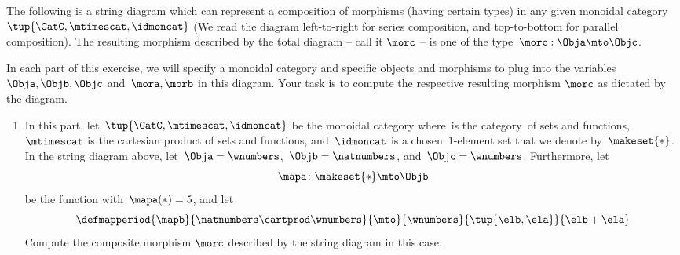 \begin{gradedexercise}\label{ex:StringDiagrams}

    The following is a string diagram which can represent a composition of morphisms (having certain types) in any given monoidal category~$\tup{\CatC,\mtimescat,\idmoncat}$
    (We read the diagram left-to-right for series composition, and top-to-bottom for parallel composition).
    The resulting morphism described by the total diagram -- call it $\morc$ -- is one of the type~$\morc : \Obja \mto \Objc$.

    \begin{center}
        \label{eq:ExamStringDiagram1}
    \end{center}

    In each part of this exercise, we will specify a monoidal category and specific objects and morphisms to plug into the variables~$\Obja, \Objb, \Objc$ and~$\mora, \morb$ in this diagram.
    Your task is to compute the respective resulting morphism $\morc$ as dictated by the diagram.

    \begin{enumerate}
        \item In this part, let~$\tup{\CatC,\mtimescat,\idmoncat}$ be the monoidal category where~\CatC is the category~\Set of sets and functions,~$\mtimescat$ is the cartesian product of sets and functions, and~$\idmoncat$ is a chosen~$1$-element set that we denote by~$\makeset{*}$.
              In the string diagram above, let~$\Obja = \wnumbers$,~$\Objb = \natnumbers$, and~$\Objc = \wnumbers$.
              Furthermore, let
              \begin{equation}
                  \mapa\colon \makeset{*} \mto \Objb
              \end{equation}
              be the function with~$\mapa(*) = 5$, and let
              \begin{equation}
                \defmapperiod{\mapb}{\natnumbers\cartprod \wnumbers}{\mto}{\wnumbers}{\tup{\elb,\ela}}{\elb+\ela}
              \end{equation}
              Compute the composite morphism $\morc$ described by the string diagram in this case.


\end{enumerate}
\end{gradedexercise}
